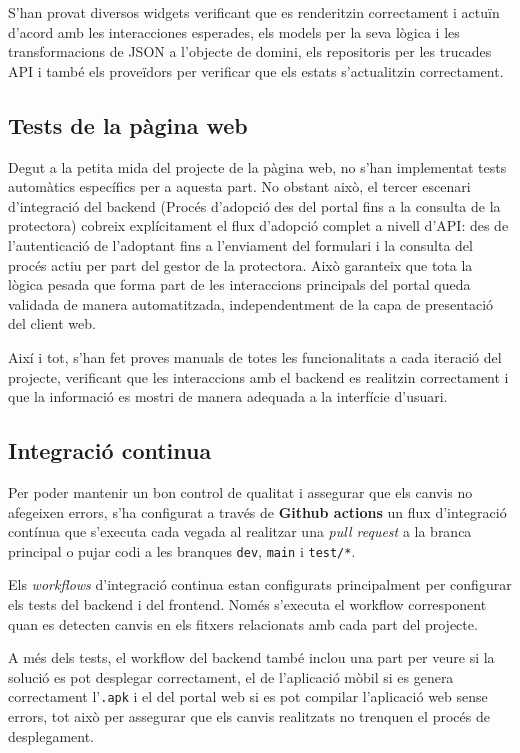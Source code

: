\documentclass[11pt,a4paper]{report}
\begin{document}
S'han provat diversos widgets verificant que es renderitzin correctament i actuïn d'acord amb les interacciones esperades, els models per la seva lògica i les transformacions de JSON a l'objecte de domini, els repositoris per les trucades API i també els proveïdors per verificar que els estats s'actualitzin correctament.

\subsection{Tests de la pàgina web}
Degut a la petita mida del projecte de la pàgina web, no s'han implementat tests automàtics específics per a aquesta part. No obstant això, el tercer escenari d'integració del backend (Procés d'adopció des del portal fins a la consulta de la protectora) cobreix explícitament el flux d'adopció complet a nivell d'API: des de l'autenticació de l'adoptant fins a l'enviament del formulari i la consulta del procés actiu per part del gestor de la protectora. Això garanteix que tota la lògica pesada que forma part de les interaccions principals del portal queda validada de manera automatitzada, independentment de la capa de presentació del client web.

Així i tot, s'han fet proves manuals de totes les funcionalitats a cada iteració del projecte, verificant que les interaccions amb el backend es realitzin correctament i que la informació es mostri de manera adequada a la interfície d'usuari.

\subsection{Integració continua}
Per poder mantenir un bon control de qualitat i assegurar que els canvis no afegeixen errors, s'ha configurat a través de \textbf{Github actions} un flux d'integració contínua que s'executa cada vegada al realitzar una \textit{pull request} a la branca principal o pujar codi a les branques \texttt{dev}, \texttt{main} i \texttt{test/*}.

Els \textit{workflows} d'integració continua estan configurats principalment per configurar els tests del backend i del frontend. Només s'executa el workflow corresponent quan es detecten canvis en els fitxers relacionats amb cada part del projecte.

A més dels tests, el workflow del backend també inclou una part per veure si la solució es pot desplegar correctament, el de l'aplicació mòbil si es genera correctament l'\texttt{.apk} i el del portal web si es pot compilar l'aplicació web sense errors, tot això per assegurar que els canvis realitzats no trenquen el procés de desplegament.
\end{document}
